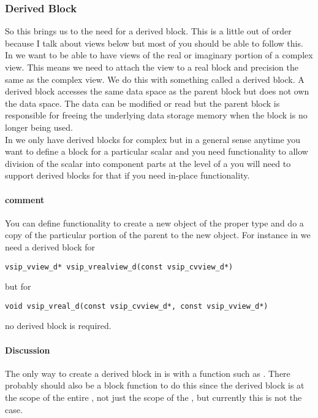\subsubsection{Derived Block}
So this brings us to the need for a derived block.  This is a little out of order because I talk about views below but most of you should be able to follow this. 
\\[6pt]
In \cvl{} we want to be able to have views of the real or imaginary portion of a complex view.  This means we need to attach the view to a real block and precision the same as the complex view.  We do this with something called a derived block.  A derived block accesses the same data space as the parent block but does not own the data space. The data can be modified or read but the parent block is responsible for freeing the underlying data storage memory when the block is no longer being used.
\\[6pt]
In \cvl{} we only have derived blocks for complex but in a general sense anytime you want to define a block for a particular scalar and you need functionality to allow division of the scalar into component parts at the level of a \vw{} you will need to support derived blocks for that if you need in-place functionality. 
\paragraph{comment}
You can define functionality to create a new \Blk{} object of the proper type and do a copy of the particular portion of the parent to the new object. For instance in \cvl{} we need a derived block for
\begin{verbatim}
vsip_vview_d* vsip_vrealview_d(const vsip_cvview_d*)
\end{verbatim}
but for 
\begin{verbatim}
void vsip_vreal_d(const vsip_cvview_d*, const vsip_vview_d*)
\end{verbatim}
no derived block is required.  
\paragraph{Discussion}
The only way to create a derived block in \cvl{} is with a \vw{} function such as . There probably should also be a block function to do this since the derived block is at the scope of the entire \blk{}, not just the scope of the \vw{}, but currently this is not the case.
